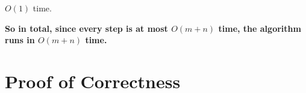 \documentclass{article}
\begin{document}
$O(1)$ time.

\textbf{So in total, since every step is at most $O(m+n)$ time, the algorithm runs in $O(m+n)$ time.}




\section{Proof of Correctness}
\end{document}
